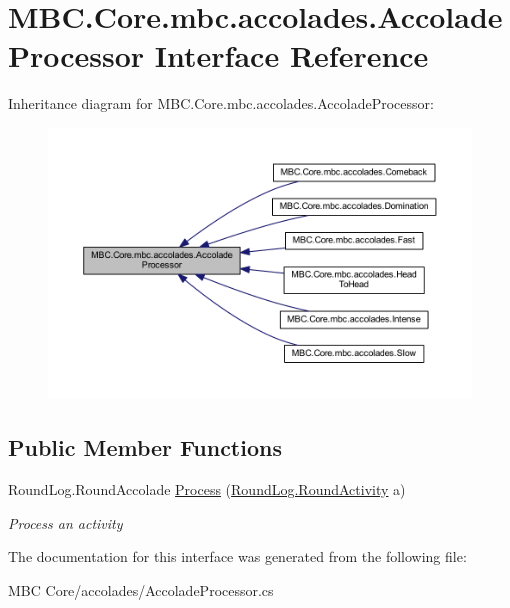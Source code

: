 \hypertarget{interface_m_b_c_1_1_core_1_1mbc_1_1accolades_1_1_accolade_processor}{\section{M\-B\-C.\-Core.\-mbc.\-accolades.\-Accolade\-Processor Interface Reference}
\label{interface_m_b_c_1_1_core_1_1mbc_1_1accolades_1_1_accolade_processor}
}


Inheritance diagram for M\-B\-C.\-Core.\-mbc.\-accolades.\-Accolade\-Processor\-:\nopagebreak
\begin{figure}[H]
\begin{center}
\leavevmode
\includegraphics[width=350pt]{interface_m_b_c_1_1_core_1_1mbc_1_1accolades_1_1_accolade_processor__inherit__graph}
\end{center}
\end{figure}
\subsection*{Public Member Functions}
\begin{DoxyCompactItemize}
\item 
\hypertarget{interface_m_b_c_1_1_core_1_1mbc_1_1accolades_1_1_accolade_processor_a5c86ce623606ca27cf87ba69a753b598}{Round\-Log.\-Round\-Accolade \hyperlink{interface_m_b_c_1_1_core_1_1mbc_1_1accolades_1_1_accolade_processor_a5c86ce623606ca27cf87ba69a753b598}{Process} (\hyperlink{class_m_b_c_1_1_core_1_1_round_log_1_1_round_activity}{Round\-Log.\-Round\-Activity} a)}\label{interface_m_b_c_1_1_core_1_1mbc_1_1accolades_1_1_accolade_processor_a5c86ce623606ca27cf87ba69a753b598}

\begin{DoxyCompactList}\small\item\em Process an activity\end{DoxyCompactList}\end{DoxyCompactItemize}


The documentation for this interface was generated from the following file\-:\begin{DoxyCompactItemize}
\item 
M\-B\-C Core/accolades/Accolade\-Processor.\-cs\end{DoxyCompactItemize}
